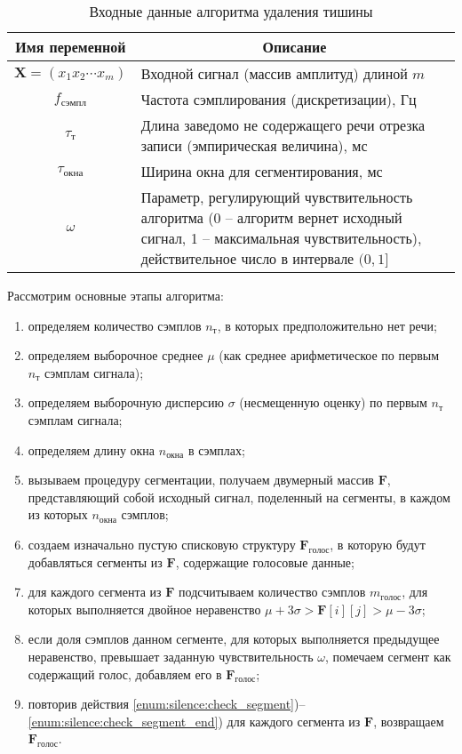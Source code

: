 \begin{table}[h]
    \caption{Входные данные алгоритма удаления тишины}
    \begin{tabular}{|c|p{13cm}|}
    \hline
    \multicolumn{1}{|c|}{\textbf{Имя переменной}} &
    \multicolumn{1}{|c|}{\textbf{Описание}} \\
    \hline
    $\mathbf{X} = (x_1 x_2 \cdots x_m)$ & Входной сигнал (массив амплитуд) длиной $m$ \\
    $f_{сэмпл}$                         & Частота сэмплирования (дискретизации), Гц \\
    $\tau_{т}$                          & Длина заведомо не содержащего речи отрезка записи (эмпирическая величина), мс\\
    $\tau_{окна}$                       & Ширина окна для сегментирования, мс\\
    $\omega$                            & Параметр, регулирующий чувствительность алгоритма (0 -- алгоритм вернет исходный сигнал, 1 -- максимальная чувствительность), действительное число в интервале $(0, 1]$\\
    \hline
    \end{tabular}
    \label{tab:unsilence_args}
\end{table}

Рассмотрим основные этапы алгоритма:

\begin{enumerate}
\item определяем количество сэмплов $n_т$, в которых предположительно нет речи;
\item определяем выборочное среднее $\mu$ (как среднее арифметическое по первым $n_т$ сэмплам сигнала);
\item определяем выборочную дисперсию $\sigma$ (несмещенную оценку) по первым $n_т$ сэмплам сигнала;
\item определяем длину окна $n_{окна}$ в сэмплах;
\item вызываем процедуру сегментации, получаем двумерный массив $\mathbf{F}$, представляющий собой исходный сигнал, поделенный на сегменты, в каждом из которых $n_{окна}$ сэмплов;
\item создаем изначально пустую списковую структуру $\mathbf{F}_{голос}$, в которую будут добавляться сегменты из $\mathbf{F}$, содержащие голосовые данные;
\item \label{enum:silence:check_segment} для каждого сегмента из $\mathbf{F}$ подсчитываем количество сэмплов $m_{голос}$, для которых выполняется двойное неравенство $\mu\!+\!3\sigma > \mathbf{F}[i][j] > \mu\!-\!3\sigma$;
\item \label{enum:silence:check_segment_end} если доля сэмплов данном сегменте, для которых выполняется предыдущее неравенство, превышает заданную чувствительность $\omega$, помечаем сегмент как содержащий голос, добавляем его в $\mathbf{F}_{голос}$;
\item повторив действия \ref{enum:silence:check_segment})--\ref{enum:silence:check_segment_end}) для каждого сегмента из $\textbf{F}$, возвращаем $\mathbf{F}_{голос}$.
\end{enumerate}

